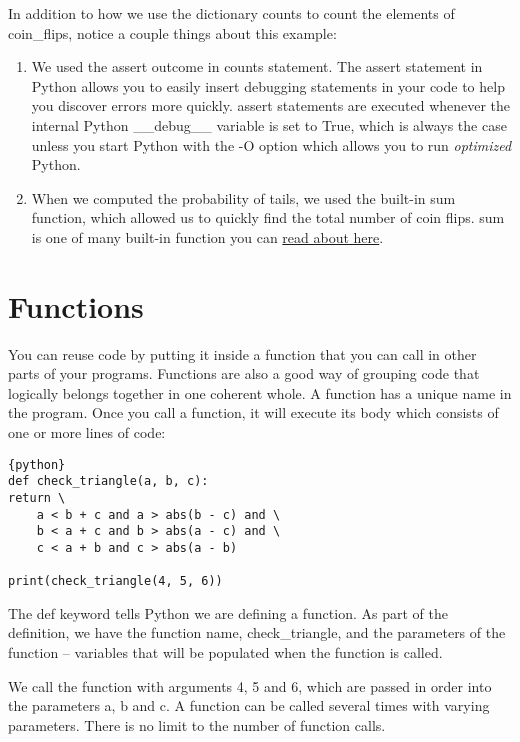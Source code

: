 In addition to how we use the dictionary counts to count the elements of
coin\_flips, notice a couple things about this example:

\begin{enumerate}
\item
  We used the assert outcome in counts statement. The assert statement
  in Python allows you to easily insert debugging statements in your
  code to help you discover errors more quickly. assert statements are
  executed whenever the internal Python \_\_debug\_\_ variable is set to
  True, which is always the case unless you start Python with the -O
  option which allows you to run \emph{optimized} Python.
\item
  When we computed the probability of tails, we used the built-in sum
  function, which allowed us to quickly find the total number of coin
  flips. sum is one of many built-in function you can
  \href{https://docs.python.org/2/library/functions.html}{read about
  here}.
\end{enumerate}

\section{Functions}\label{functions}

You can reuse code by putting it inside a function that you can call in
other parts of your programs. Functions are also a good way of grouping
code that logically belongs together in one coherent whole. A function
has a unique name in the program. Once you call a function, it will
execute its body which consists of one or more lines of code:

\begin{lstlisting}{python}
def check_triangle(a, b, c):
return \
    a < b + c and a > abs(b - c) and \
    b < a + c and b > abs(a - c) and \
    c < a + b and c > abs(a - b)

print(check_triangle(4, 5, 6))
\end{lstlisting}

The def keyword tells Python we are defining a function. As part of the
definition, we have the function name, check\_triangle, and the
parameters of the function -- variables that will be populated when the
function is called.

We call the function with arguments 4, 5 and 6, which are passed in
order into the parameters a, b and c. A function can be called several
times with varying parameters. There is no limit to the number of
function calls.

